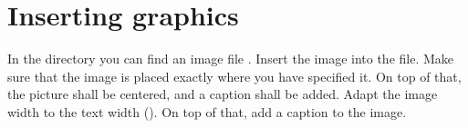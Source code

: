\section{Inserting graphics}

In the  directory you can find an image file 
. Insert the image into the 
 file. Make sure that the image is placed 
exactly where you have specified it. On top of that, the picture shall be 
centered, and a caption shall be added. Adapt the image width to the text width 
(). On top of that, add a caption to the image.
